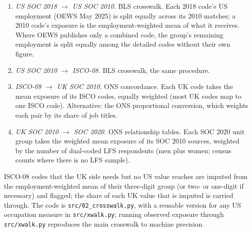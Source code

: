 \documentclass[11pt]{article}
\begin{document}
\begin{enumerate}
  \item \emph{US SOC 2018 $\to$ US SOC 2010.} BLS crosswalk. Each 2018 code's US employment (OEWS May 2025) is split equally across its 2010 matches; a 2010 code's exposure is the employment-weighted mean of what it receives. Where OEWS publishes only a combined code, the group's remaining employment is split equally among the detailed codes without their own figure.
  \item \emph{US SOC 2010 $\to$ ISCO-08.} BLS crosswalk, the same procedure.
  \item \emph{ISCO-08 $\to$ UK SOC 2010.} ONS concordance. Each UK code takes the mean exposure of its ISCO codes, equally weighted (most UK codes map to one ISCO code). Alternative: the ONS proportional conversion, which weights each pair by its share of job titles.
  \item \emph{UK SOC 2010 $\to$ SOC 2020.} ONS relationship tables. Each SOC 2020 unit group takes the weighted mean exposure of its SOC 2010 sources, weighted by the number of dual-coded LFS respondents (men plus women; census counts where there is no LFS sample).
\end{enumerate}
ISCO-08 codes that the UK side needs but no US value reaches are imputed from the employment-weighted mean of their three-digit group (or two- or one-digit if necessary) and flagged; the share of each UK value that is imputed is carried through. The code is \texttt{src/02\_crosswalk.py}, with a reusable version for any US occupation measure in \texttt{src/xwalk.py}; running observed exposure through \texttt{src/xwalk.py} reproduces the main crosswalk to machine precision.
\end{document}
